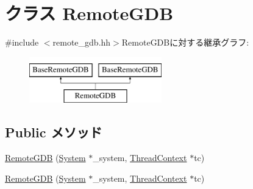 \hypertarget{classMipsISA_1_1RemoteGDB}{
\section{クラス RemoteGDB}
\label{classMipsISA_1_1RemoteGDB}
}


{\ttfamily \#include $<$remote\_\-gdb.hh$>$}RemoteGDBに対する継承グラフ:\begin{figure}[H]
\begin{center}
\leavevmode
\includegraphics[height=2cm]{classMipsISA_1_1RemoteGDB}
\end{center}
\end{figure}
\subsection*{Public メソッド}
\begin{DoxyCompactItemize}
\item 
\hyperlink{classMipsISA_1_1RemoteGDB_a378793e7a68420568b51f355b7e8c473}{RemoteGDB} (\hyperlink{classSystem}{System} $\ast$\_\-system, \hyperlink{classThreadContext}{ThreadContext} $\ast$tc)
\item 
\hyperlink{classMipsISA_1_1RemoteGDB_a378793e7a68420568b51f355b7e8c473}{RemoteGDB} (\hyperlink{classSystem}{System} $\ast$\_\-system, \hyperlink{classThreadContext}{ThreadContext} $\ast$tc)
\end{DoxyCompactItemize}
